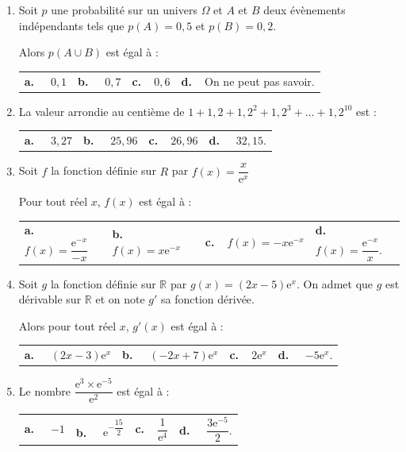 \documentclass[10pt]{article}
\providecommand{\R}{\mathbb{R}}
\providecommand{\e}{{\mathrm{e}}}
\begin{document}
\begin{enumerate}
\item Soit $p$ une probabilité sur un univers $\Omega$ et $A$ et $B$ deux évènements indépendants tels que
$p(A) = 0,5$ et $p(B) = 0,2$.

Alors $p(A\cup B)$ est égal à :

\begin{center}
\begin{tabularx}{\linewidth}{*{4}{X}}
\textbf{a.~~} $0,1$ &\textbf{b.~~} $0,7$&\textbf{c.~~}$0,6$& \textbf{d.~~}On ne peut pas savoir.
\end{tabularx}
\end{center}

\item La valeur arrondie au centième de $1 + 1,2 + 1,2^2 + 1,2^3 + \dots + 1,2^{10}$ est :

\begin{center}
\begin{tabularx}{\linewidth}{*{4}{X}}
\textbf{a.~~} $3,27$ &\textbf{b.~~} $25,96$&\textbf{c.~~}$26,96$& \textbf{d.~~} $32,15$.
\end{tabularx}
\end{center}

\item Soit $f$ la fonction définie sur $R$ par $f(x) =\dfrac{x}{\e^x}$

Pour tout réel $x$, $f(x)$ est égal à :

\begin{center}
\begin{tabularx}{\linewidth}{*{4}{X}}
\textbf{a.~~} $f(x) = \dfrac{\e^{-x}}{-x}$ &\textbf{b.~~} $f(x) = x\e^{-x}$&\textbf{c.~~}$f(x) = -x\e^{-x}$& \textbf{d.~~} $f(x) = \dfrac{\e^{-x}}{x}$.
\end{tabularx}
\end{center}

\item Soit $g$ la fonction définie sur $\R$ par $g(x) = (2x - 5)\e^x$. On admet que $g$ est dérivable sur $\R$
et on note $g'$ sa fonction dérivée.

Alors pour tout réel $x$, $g'(x)$ est égal à :

\begin{center}
\begin{tabularx}{\linewidth}{*{4}{X}}
\textbf{a.~~} $(2x -3)\e^x$ &\textbf{b.~~} $(-2x + 7)\e^x$&\textbf{c.~~}$2\e^x$& \textbf{d.~~} $-5\e^x$.
\end{tabularx}
\end{center}

\item  Le nombre $\dfrac{\e^3\times \e^{-5}}{\e^2}$ est égal à :

\begin{center}
\begin{tabularx}{\linewidth}{*{4}{X}}
\textbf{a.~~} $ -1 $ &\textbf{b.~~} $\e^{-\dfrac{15}{2}}$&\textbf{c.~~}$ \dfrac{1}{\e^{4}}$& \textbf{d.~~} $\dfrac{3 \e^{-5}}{2} $.
\end{tabularx}
\end{center}

\end{enumerate}

\vspace{0,5cm}
\end{document}
